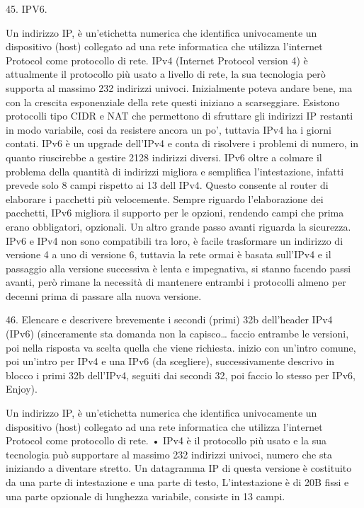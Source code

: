  

45.	IPV6.

Un indirizzo IP, è un’etichetta numerica che identifica univocamente un dispositivo (host) collegato ad una rete informatica che utilizza l’internet Protocol come protocollo di rete.
IPv4 (Internet Protocol version 4) è attualmente il protocollo più usato a livello di rete, la sua tecnologia però supporta al massimo 232 indirizzi univoci.
Inizialmente poteva andare bene, ma con la crescita esponenziale della rete questi iniziano a scarseggiare. Esistono protocolli tipo CIDR e NAT che permettono di sfruttare gli indirizzi IP restanti in modo variabile, cosi da resistere ancora un po’, tuttavia IPv4 ha i giorni contati.
IPv6 è un upgrade dell’IPv4 e conta di risolvere i problemi di numero, in quanto riuscirebbe a gestire 2128 indirizzi diversi.
IPv6 oltre a colmare il problema della quantità di indirizzi migliora e semplifica l’intestazione, infatti prevede solo 8 campi rispetto ai 13 dell IPv4. Questo consente al router di elaborare i pacchetti più velocemente. Sempre riguardo l’elaborazione dei pacchetti, IPv6 migliora il supporto per le opzioni, rendendo campi che prima erano obbligatori, opzionali. Un altro grande passo avanti riguarda la sicurezza.
IPv6 e IPv4 non sono compatibili tra loro, è facile trasformare un indirizzo di versione 4 a uno di versione 6, tuttavia la rete ormai è basata sull’IPv4 e il passaggio alla versione successiva è lenta e impegnativa, si stanno facendo passi avanti, però rimane la necessità di mantenere entrambi i protocolli almeno per decenni prima di passare alla nuova versione.

46.	Elencare e descrivere brevemente i secondi (primi) 32b dell'header IPv4 (IPv6)
(sinceramente sta domanda non la capisco… faccio entrambe le versioni, poi nella risposta va scelta quella che viene richiesta. inizio con un’intro comune, poi un’intro per IPv4 e una IPv6 (da scegliere), successivamente descrivo in blocco i primi 32b dell’IPv4, seguiti dai secondi 32, poi faccio lo stesso per IPv6, Enjoy).

Un indirizzo IP, è un’etichetta numerica che identifica univocamente un dispositivo (host) collegato ad una rete informatica che utilizza l’internet Protocol come protocollo di rete.
•	IPv4 è il protocollo più usato e la sua tecnologia può supportare al massimo 232 indirizzi univoci, numero che sta iniziando a diventare stretto.
Un datagramma IP di questa versione è costituito da una parte di intestazione e una parte di testo, L’intestazione è di 20B fissi e una parte opzionale di lunghezza variabile, consiste in 13 campi.

